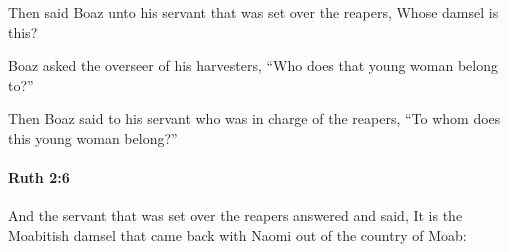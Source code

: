 			\begin{versebox}
					\item[BHS] 
					\item[LXX] 
					\item[ASV] Then said Boaz unto his servant that was set over the reapers, Whose damsel is this?
					\item[NIV] Boaz asked the overseer of his harvesters, “Who does that young woman belong to?”
					\item[NRSV] Then Boaz said to his servant who was in charge of the reapers, “To whom does this young woman belong?”
			\end{versebox}

		\paragraph{Ruth 2:6} %
			\label{RUTH-2-6}

			And the servant that was set over the reapers answered and said, It is the Moabitish damsel that came back with Naomi out of the country of Moab:

